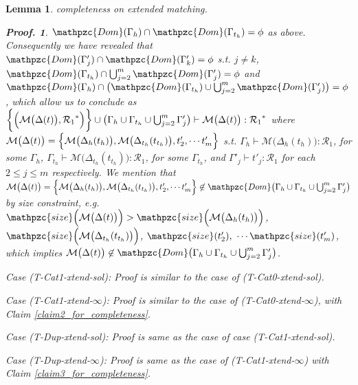 \documentclass[12pt]{article}
\newtheorem{Lemma}{Lemma}[section]
\newtheorem{Proof}{Proof.}
\begin{document}
\begin{Lemma}{completeness on extended matching.}
\begin{Proof}
    $\mathpzc{Dom}(\Gamma_h) \cap \mathpzc{Dom}(\Gamma_{t_h}) = \phi$ as
    above. Consequently we have revealed that
    $\mathpzc{Dom}(\Gamma'_j) \cap \mathpzc{Dom}(\Gamma'_k) = \phi$ s.t.
    $j \neq k$,
    $\mathpzc{Dom}(\Gamma_{t_h}) \cap \bigcup_{j=2}^m \mathpzc{Dom}(
    \Gamma'_j) = \phi$ and
    $\mathpzc{Dom}(\Gamma_h) \cap \bigl(\mathpzc{Dom}(\Gamma_{t_h}) \cup
    \bigcup_{j=2}^m \mathpzc{Dom}(\Gamma'_j) \bigr) = \phi$, which
    allow us to conclude as
    $\biggl\{\Bigl(\mathcal{M}\bigl(\Delta(t) \bigr), {\mathcal{R}_1}^*
    \Bigr) \biggr\} \cup \bigl(\Gamma_h \cup \Gamma_{t_h} \cup
    \bigcup_{j=2}^m \Gamma'_j \bigr) \vdash
    \mathcal{M}\bigl(\Delta(t) \bigr) : {\mathcal{R}_1}^*$ where
    $\mathcal{M}\bigl(\Delta(t) \bigr) = \Bigl\{
    \mathcal{M}\bigl(\Delta_h(t_h) \bigr),
    \mathcal{M}\bigl(\Delta_{t_h}(t_{t_h}) \bigr), t'_2, \cdots t'_m
    \Bigr\}$ s.t.
    $\Gamma_h \vdash \mathcal{M}\bigl(\Delta_h(t_h) \bigr) :
    \mathcal{R}_1$, for some $\Gamma_h$,
    $\Gamma_{t_h} \vdash \mathcal{M}\bigl(\Delta_{t_h}(t_{t_h}) \bigr) :
    \mathcal{R}_1$, for some $\Gamma_{t_h}$, and
    $\Gamma'_j \vdash t'_j : \mathcal{R}_1$ for each $2 \le j \le m$
    respectively. We mention that
    $\mathcal{M}\bigl(\Delta(t) \bigr) = \Bigl\{
    \mathcal{M}\bigl(\Delta_h(t_h) \bigr),
    \mathcal{M}\bigl(\Delta_{t_h}(t_{t_h}) \bigr), t'_2, \cdots t'_m
    \Bigr\} \not\in \mathpzc{Dom}\bigl(\Gamma_h \cup \Gamma_{t_h} \cup
    \bigcup_{j=2}^m \Gamma'_j \bigr)$ by size constraint, e.g.
    $\mathpzc{size}\Bigl(\mathcal{M}\bigl(\Delta(t) \bigr) \Bigr) >
    \mathpzc{size}\Bigl(\mathcal{M}\bigl(\Delta_h(t_h) \bigr) \Bigr)$,
    $\mathpzc{size}\Bigl(\mathcal{M}\bigl(\Delta_{t_h}(t_{t_h}) \bigr)
    \Bigr)$, $\mathpzc{size}(t'_2),\ \cdots \mathpzc{size}(t'_m)$, which
    implies $\mathcal{M}\bigl(\Delta(t) \bigr) \not\in \mathpzc{Dom}\bigl(
    \Gamma_h \cup \Gamma_{t_h} \cup \bigcup_{j=2}^m \Gamma'_j \bigr)$.
    
    Case (T-Cat1-xtend-sol):
    Proof is similar to the case of (T-Cat0-xtend-sol).
    
    Case (T-Cat1-xtend-$\infty$):
    Proof is similar to the case of (T-Cat0-xtend-$\infty$), with Claim
    \ref{claim2_for_completeness}.
    
    Case (T-Dup-xtend-sol):
    Proof is same as the case of case (T-Cat1-xtend-sol).
    
    Case (T-Dup-xtend-$\infty$):
    Proof is same as the case of (T-Cat1-xtend-$\infty$) with Claim
    \ref{claim3_for_completeness}.
    

\end{Proof}
\end{Lemma}
\end{document}
